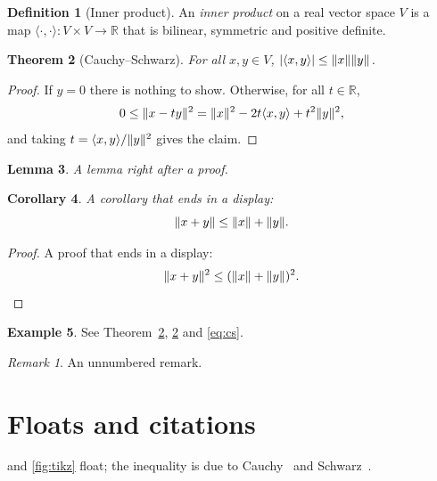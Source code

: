 \documentclass[11pt,letterpaper]{article}
\newtheorem{theorem}{Theorem}[section]
\newtheorem{lemma}[theorem]{Lemma}
\newtheorem{corollary}[theorem]{Corollary}
\theoremstyle{definition}
\newtheorem{definition}[theorem]{Definition}
\newtheorem{example}[theorem]{Example}
\theoremstyle{remark}
\newtheorem*{remark}{Remark}
\DeclarePairedDelimiter{\abs}{\lvert}{\rvert}
\DeclarePairedDelimiter{\norm}{\lVert}{\rVert}
\newcommand{\R}{\mathbb{R}}
\begin{document}
\begin{definition}[Inner product]
    An \emph{inner product} on a real vector space $V$ is a map $\langle \cdot, \cdot \rangle \colon V \times V \to \R$ that is bilinear, symmetric and positive definite.
\end{definition}
\begin{theorem}[Cauchy--Schwarz]\label{thm:cs}
    For all $x, y \in V$, $\abs{\langle x, y \rangle} \leq \norm{x}\norm{y}$.
\end{theorem}
\begin{proof}
    If $y = 0$ there is nothing to show. Otherwise, for all $t \in \R$,
    \[ 0 \leq \norm{x - ty}^2 = \norm{x}^2 - 2t\langle x, y \rangle + t^2 \norm{y}^2, \]
    and taking $t = \langle x, y \rangle / \norm{y}^2$ gives the claim. \qedhere
\end{proof}
\begin{lemma}
    A lemma right after a proof.
\end{lemma}
\begin{corollary}
    A corollary that ends in a display:
    \[ \norm{x + y} \leq \norm{x} + \norm{y}. \]
\end{corollary}
\begin{proof}
    A proof that ends in a display:
    \[ \norm{x + y}^2 \leq (\norm{x} + \norm{y})^2. \qedhere \]
\end{proof}
\begin{example}
    See Theorem~\ref{thm:cs}, \cref{thm:cs} and \eqref{eq:cs}.
\end{example}
\begin{remark}
    An unnumbered remark.
\end{remark}


\section{Floats and citations}

 and \cref{fig:tikz} float; the inequality is due to Cauchy~\cite{cauchy} and Schwarz~\cite{schwarz}.
\end{document}

